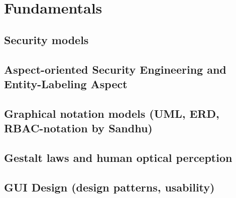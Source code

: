 \chapter{Fundamentals}
\label{fundamentals}


\section{Security models}
\label{security_models}


\section{Aspect-oriented Security Engineering and Entity-Labeling Aspect}
\label{AOSE}


\section{Graphical notation models (UML, ERD, RBAC-notation by Sandhu)}
\label{graphical_notations}


\section{Gestalt laws and human optical perception}


\section{GUI Design (design patterns, usability)}
\label{gui_design}

